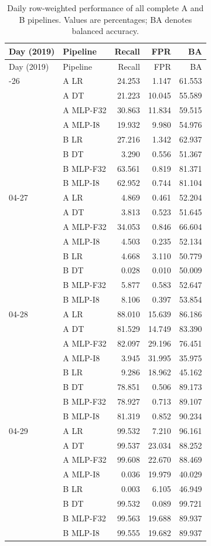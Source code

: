 \begin{longtable}{llrrr}
\caption{Daily row-weighted performance of all complete A and B pipelines. Values are percentages; BA denotes balanced accuracy.}\label{tab:daily-complete}\\
\toprule
Day (2019) & Pipeline & Recall & FPR & BA \\
\midrule
\endfirsthead
\toprule
Day (2019) & Pipeline & Recall & FPR & BA \\
\midrule
\endhead
\bottomrule
\endfoot
04-26 & A LR & 24.253 & 1.147 & 61.553 \\
 & A DT & 21.223 & 10.045 & 55.589 \\
 & A MLP-F32 & 30.863 & 11.834 & 59.515 \\
 & A MLP-I8 & 19.932 & 9.980 & 54.976 \\
 & B LR & 27.216 & 1.342 & 62.937 \\
 & B DT & 3.290 & 0.556 & 51.367 \\
 & B MLP-F32 & 63.561 & 0.819 & 81.371 \\
 & B MLP-I8 & 62.952 & 0.744 & 81.104 \\
\midrule
04-27 & A LR & 4.869 & 0.461 & 52.204 \\
 & A DT & 3.813 & 0.523 & 51.645 \\
 & A MLP-F32 & 34.053 & 0.846 & 66.604 \\
 & A MLP-I8 & 4.503 & 0.235 & 52.134 \\
 & B LR & 4.668 & 3.110 & 50.779 \\
 & B DT & 0.028 & 0.010 & 50.009 \\
 & B MLP-F32 & 5.877 & 0.583 & 52.647 \\
 & B MLP-I8 & 8.106 & 0.397 & 53.854 \\
\midrule
04-28 & A LR & 88.010 & 15.639 & 86.186 \\
 & A DT & 81.529 & 14.749 & 83.390 \\
 & A MLP-F32 & 82.097 & 29.196 & 76.451 \\
 & A MLP-I8 & 3.945 & 31.995 & 35.975 \\
 & B LR & 9.286 & 18.962 & 45.162 \\
 & B DT & 78.851 & 0.506 & 89.173 \\
 & B MLP-F32 & 78.927 & 0.713 & 89.107 \\
 & B MLP-I8 & 81.319 & 0.852 & 90.234 \\
\midrule
04-29 & A LR & 99.532 & 7.210 & 96.161 \\
 & A DT & 99.537 & 23.034 & 88.252 \\
 & A MLP-F32 & 99.608 & 22.670 & 88.469 \\
 & A MLP-I8 & 0.036 & 19.979 & 40.029 \\
 & B LR & 0.003 & 6.105 & 46.949 \\
 & B DT & 99.532 & 0.089 & 99.721 \\
 & B MLP-F32 & 99.563 & 19.688 & 89.937 \\
 & B MLP-I8 & 99.555 & 19.682 & 89.937 \\
\midrule
\end{longtable}
